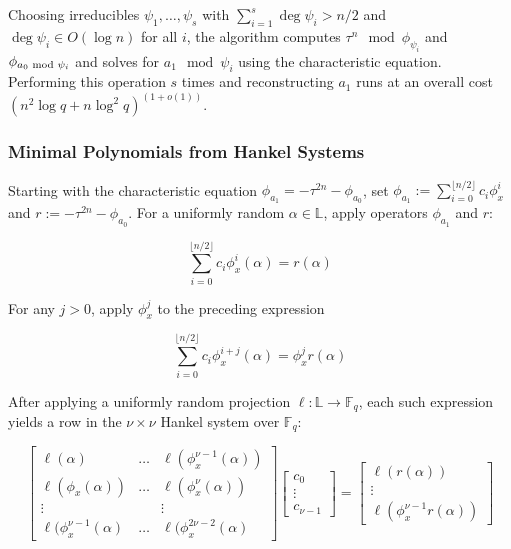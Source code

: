 \documentclass[sigconf]{acmart}
\newcommand{\F}{\mathbb{F}}
\renewcommand{\L}{\mathbb{L}}
\begin{document}
Choosing irreducibles $\psi_1, \ldots, \psi_s$ with $\sum_{i=1}^s \deg \psi_i > n/2$ and $\deg \psi_i \in O(\log n)$ for all $i$, the algorithm computes $\tau^n \mod \phi_{\psi_i}$ and $\phi_{a_0 \textnormal{ mod } \psi_i}$ and solves for $a_1 \mod \psi_i$ using the characteristic equation. Performing this operation $s$ times and reconstructing $a_1$ runs at an overall cost $(n^2\log q + n \log^2 q)^{(1 + o(1))}$.

\subsubsection{Minimal Polynomials from Hankel Systems} Starting with the characteristic equation $\phi_{a_1} = -\tau^{2n} - \phi_{a_0}$, set $\phi_{a_1} := \sum_{i=0}^{\lfloor n/2 \rfloor} c_i\phi_{x}^i$ and $r := -\tau^{2n} - \phi_{a_0}$. For a uniformly random $\alpha \in \L$, apply operators $\phi_{a_1}$ and $r$:

\begin{equation*}
    \sum_{i=0}^{\lfloor n/2 \rfloor} c_i\phi_{x}^i(\alpha) = r(\alpha)
\end{equation*}

For any $j > 0$, apply $\phi_x^j$ to the preceding expression

\begin{equation*}
    \sum_{i=0}^{\lfloor n/2 \rfloor} c_i\phi_{x}^{i +j}(\alpha) = \phi_x^jr(\alpha)
\end{equation*}

After applying a uniformly random projection $\ell : \L \to \F_q$, each such expression yields a row in the $\nu \times \nu$ Hankel system over $\F_q$:

\begin{equation*}
    \begin{bmatrix}
    \ell(\alpha) & \ldots & \ell(\phi_x^{\nu - 1}(\alpha)) \\
    \ell(\phi_x(\alpha)) & \ldots & \ell(\phi_x^{\nu}(\alpha)) \\
    \vdots & & \vdots \\
    \ell(\phi_x^{\nu - 1}(\alpha) & \ldots & \ell(\phi_x^{2\nu - 2}(\alpha)
    \end{bmatrix}
    \begin{bmatrix}c_0 \\ \vdots \\ c_{\nu - 1} \end{bmatrix} = 
    \begin{bmatrix} \ell (r(\alpha)) \\ \vdots \\ \ell(\phi_x^{\nu - 1}r(\alpha)) \end{bmatrix}
\end{equation*}
\end{document}

